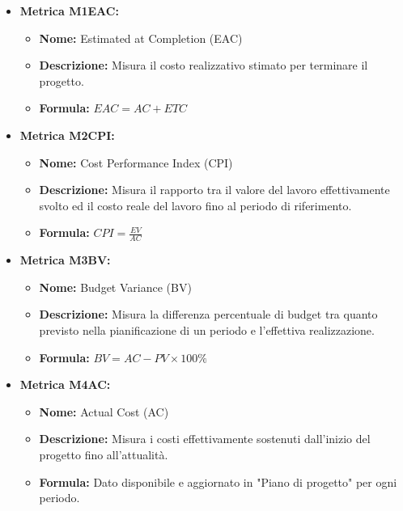 \begin{itemize}
    \item \textbf{Metrica M1EAC:}
          \begin{itemize}
              \item \textbf{Nome:} Estimated at Completion (EAC)
              \item \textbf{Descrizione:} Misura il costo realizzativo stimato per terminare il progetto.
              \item \textbf{Formula:} $EAC = AC + ETC$
          \end{itemize}

    \item \textbf{Metrica M2CPI:}
          \begin{itemize}
              \item \textbf{Nome:} Cost Performance Index (CPI)
              \item \textbf{Descrizione:} Misura il rapporto tra il valore del lavoro effettivamente svolto ed il costo reale del lavoro fino al periodo di riferimento.
              \item \textbf{Formula:} $CPI = \frac{EV}{AC}$
          \end{itemize}

    \item \textbf{Metrica M3BV:}
          \begin{itemize}
              \item \textbf{Nome:} Budget Variance (BV)
              \item \textbf{Descrizione:} Misura la differenza percentuale di budget tra quanto previsto nella pianificazione di un periodo e l’effettiva realizzazione.
              \item \textbf{Formula:} $BV = AC - PV \times 100\% $
          \end{itemize}

    \item \textbf{Metrica M4AC:}
          \begin{itemize}
              \item \textbf{Nome:} Actual Cost (AC)
              \item \textbf{Descrizione:} Misura i costi effettivamente sostenuti dall’inizio del progetto fino all’attualità.
              \item \textbf{Formula:} Dato disponibile e aggiornato in "Piano di progetto" per ogni periodo.
          \end{itemize}


\end{itemize}
